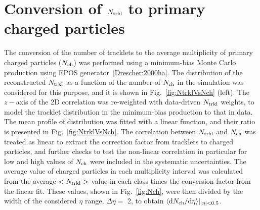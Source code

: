 \section {Conversion of $N_{\rm trkl}$ to primary charged particles}
\label{sec:NtrklToNch}
The conversion of the number of tracklets to the average multiplicity of primary charged particles ($N_{\rm ch}$) 
was performed using a minimum-bias Monte Carlo production using EPOS generator~\ref{Drescher:2000ha}. 
The distribution of the reconstructed $N_{\rm trkl}$ as a function of the number of
$N_{\rm ch}$ in the simulation was considered for this purpose, and it is shown in Fig.~\ref{fig:NtrklVsNch} (left).
The $z-$axis of the 2D correlation was re-weighted with data-driven $N_{\rm trkl}$ weights, to model the tracklet
distribution in the minimum-bias production to that in data. 
The mean profile of distribution was fitted with a linear function, and their ratio
is presented in Fig.~\ref{fig:NtrklVsNch}. The correlation between $N_{\rm trkl}$ and $N_{\rm ch}$ 
was treated as linear to extract the correction factor from tracklets to charged particles,
and further checks to test the non-linear correlation in particular for low and high values of
$N_{\rm ch}$ were included in the systematic uncertainties.
The average value of charged particles in each multiplicity interval
was calculated from the average $<N_{\rm trkl}>$ value in each class 
times the conversion factor from the linear fit.
These values, shown in Fig.~\ref{fig:Nch}, were then divided by the 
width of the considered $\eta$ range, $\Delta \eta =$ 2, 
to obtain $\langle {\rm d} N_{\rm ch}/{\rm d}  \eta \rangle |_{|\eta|<0.5}$.\\



